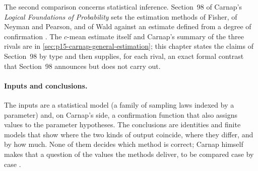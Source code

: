The second comparison concerns statistical inference. Section~98 of
Carnap's \emph{Logical Foundations of Probability} sets the estimation
methods of Fisher, of Neyman and Pearson, and of Wald against an
estimate defined from a degree of confirmation
\cite[sec.~98, pp.~511--520]{Carnap1950Probability}. The
\(c\)-mean estimate itself and Carnap's summary of the three rivals are
in \cref{sec:p15-carnap-general-estimation}; this chapter states the
claims of Section~98 by type and then supplies, for each rival, an exact
formal contrast that Section~98 announces but does not carry out.

\paragraph{Inputs and conclusions.}
The inputs are a statistical model (a family of sampling laws indexed by
a parameter) and, on Carnap's side, a confirmation function that also
assigns values to the parameter hypotheses. The conclusions are
identities and finite models that show where the two kinds of output
coincide, where they differ, and by how much. None of them decides
which method is correct; Carnap himself makes that a question of the
values the methods deliver, to be compared case by case
\cite[sec.~98, pp.~519--520]{Carnap1950Probability}.

